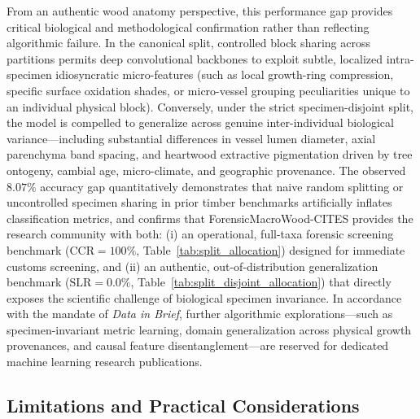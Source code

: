 \documentclass[a4paper,fleqn,12pt]{cas-sc}
\begin{document}
From an authentic wood anatomy perspective, this performance gap provides critical biological and methodological confirmation rather than reflecting algorithmic failure. In the canonical split, controlled block sharing across partitions permits deep convolutional backbones to exploit subtle, localized intra-specimen idiosyncratic micro-features (such as local growth-ring compression, specific surface oxidation shades, or micro-vessel grouping peculiarities unique to an individual physical block). Conversely, under the strict specimen-disjoint split, the model is compelled to generalize across genuine inter-individual biological variance---including substantial differences in vessel lumen diameter, axial parenchyma band spacing, and heartwood extractive pigmentation driven by tree ontogeny, cambial age, micro-climate, and geographic provenance. The observed $8.07\%$ accuracy gap quantitatively demonstrates that naive random splitting or uncontrolled specimen sharing in prior timber benchmarks artificially inflates classification metrics, and confirms that ForensicMacroWood-CITES provides the research community with both: (i) an operational, full-taxa forensic screening benchmark ($\text{CCR} = 100\%$, Table~\ref{tab:split_allocation}) designed for immediate customs screening, and (ii) an authentic, out-of-distribution generalization benchmark ($\text{SLR} = 0.0\%$, Table~\ref{tab:split_disjoint_allocation}) that directly exposes the scientific challenge of biological specimen invariance. In accordance with the mandate of \textit{Data in Brief}, further algorithmic explorations---such as specimen-invariant metric learning, domain generalization across physical growth provenances, and causal feature disentanglement---are reserved for dedicated machine learning research publications.

\subsection{Limitations and Practical Considerations}
\label{sec:limitations}
\end{document}
